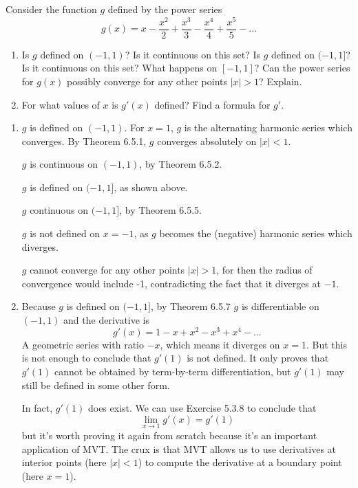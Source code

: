 \documentclass{oxmathproblems}
\begin{document}
\begin{questions}

\miquestion Consider the function $g$ defined by the power series
\[g(x) = x - \frac{x^2}{2} + \frac{x^3}{3} - \frac{x^4}{4} + \frac{x^5}{5} - ...\]
\begin{enumerate}[label=(\alph*)]
  \item Is $g$ defined on $(-1, 1)$? Is it continuous on this set? Is $g$ defined on $(-1, 1]$? Is it continuous on this set? What happens on $[-1, 1]$?
  Can the power series for $g(x)$ possibly converge for any other points $|x| > 1$? Explain.
  \item For what values of $x$ is $g'(x)$ defined? Find a formula for $g'$.
\end{enumerate}

\begin{solution}
  \begin{enumerate}[label=(\alph*)]
    \item $g$ is defined on $(-1, 1)$. For $x=1$, $g$ is the alternating harmonic series which converges. By Theorem 6.5.1, $g$ converges absolutely on $|x| < 1$.
    
    $g$ is continuous on $(-1, 1)$, by Theorem 6.5.2.

    $g$ is defined on $(-1, 1]$, as shown above.

    $g$ continuous on $(-1, 1]$, by Theorem 6.5.5.

    $g$ is not defined on $x=-1$, as $g$ becomes the (negative) harmonic series which diverges.

    $g$ cannot converge for any other points $|x| > 1$, for then the radius of convergence would include -1, contradicting the fact that it diverges at $-1$.
  
    \item Because $g$ is defined on $(-1, 1]$, by Theorem 6.5.7 $g$ is differentiable on $(-1, 1)$ and the derivative is
    \[g'(x)=1-x+x^2-x^3+x^4-...\]
    A geometric series with ratio $-x$, which means it diverges on $x=1$. But this is not enough to conclude that $g'(1)$ is not defined. It only proves that
    $g'(1)$ cannot be obtained by term-by-term differentiation, but $g'(1)$ may still be defined in some other form.

    In fact, $g'(1)$ does exist. We can use Exercise 5.3.8 to conclude that
    \[\lim_{x \to 1}g'(x)=g'(1)\]
    but it's worth proving it again from scratch because it's an important application of MVT. The crux is that
    MVT allows us to use derivatives at interior points (here $|x| < 1$) to compute the derivative at a boundary point (here $x=1$).


\end{enumerate}
\end{solution}
\end{questions}
\end{document}
